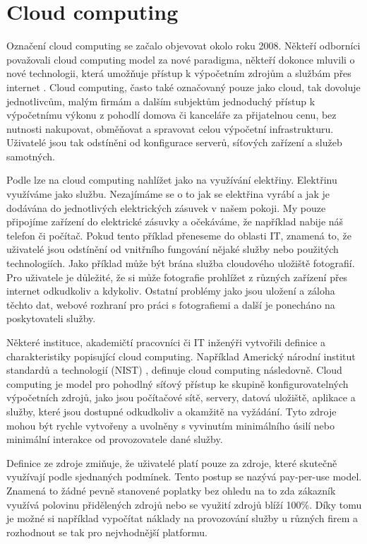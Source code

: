 \chapter{Cloud computing}
Označení cloud computing se začalo objevovat okolo roku 2008\cite{ZHANG}. Někteří odborníci považovali cloud computing model za nové paradigma, někteří dokonce mluvili o nové technologii, která umožňuje přístup k výpočetním zdrojům a službám přes internet \cite{bohm2010cloud}. Cloud computing, často také označovaný pouze jako cloud, tak dovoluje jednotlivcům, malým firmám a dalším subjektům jednoduchý přístup k výpočetnímu výkonu z pohodlí domova či kanceláře za přijatelnou cenu, bez nutnosti nakupovat, obměňovat \linebreak a spravovat celou výpočetní infrastrukturu. Uživatelé jsou tak odstíněni od konfigurace serverů, síťových zařízení a služeb samotných. \par
Podle \cite{cc2011principles} lze na cloud computing nahlížet jako na využívání elektřiny. Elektřinu využíváme jako službu. Nezajímáme se o to jak se elektřina vyrábí a jak je dodávána do jednotlivých elektrických zásuvek v našem pokoji. My pouze připojíme zařízení \linebreak do elektrické zásuvky a očekáváme, že například nabije náš telefon či počítač. Pokud tento příklad přeneseme do oblasti IT, znamená to, že uživatelé jsou odstínění \linebreak od vnitřního fungování nějaké služby nebo použitých technologiích. Jako příklad může být brána služba cloudového uložiště fotografií. Pro uživatele je důležité, že si může fotografie prohlížet  z různých zařízení přes internet odkudkoliv a kdykoliv. Ostatní problémy jako jsou uložení a záloha těchto dat, webové rozhraní pro práci s fotografiemi a další je ponecháno na poskytovateli služby. \par 
Některé instituce, akademičtí pracovníci či IT inženýři vytvořili definice a charakteristiky  popisující cloud computing. Například Americký národní institut standardů a technologií (NIST) \cite{mel2011nist}, definuje cloud computing následovně.
Cloud computing je model pro pohodlný síťový přístup ke skupině konfigurovatelných výpočetních zdrojů, jako jsou počítačové sítě, servery, datová uložiště, aplikace a služby, které jsou dostupné odkudkoliv a okamžitě na vyžádání. Tyto zdroje mohou být rychle vytvořeny a uvolněny  s vyvinutím minimálního úsilí nebo minimální interakce od provozovatele dané služby. \par
Definice ze zdroje \cite{Vaquero-cloud-definition} zmiňuje, že uživatelé platí pouze za zdroje, které skutečně využívají podle sjednaných podmínek. Tento postup se nazývá pay-per-use model. Znamená to žádné pevně stanovené poplatky bez ohledu na to zda zákazník využívá polovinu přidělených zdrojů nebo se využití zdrojů blíží 100\%. Díky tomu je možné si například vypočítat náklady na provozování služby u různých firem a rozhodnout se tak pro nejvhodnější platformu. \par
